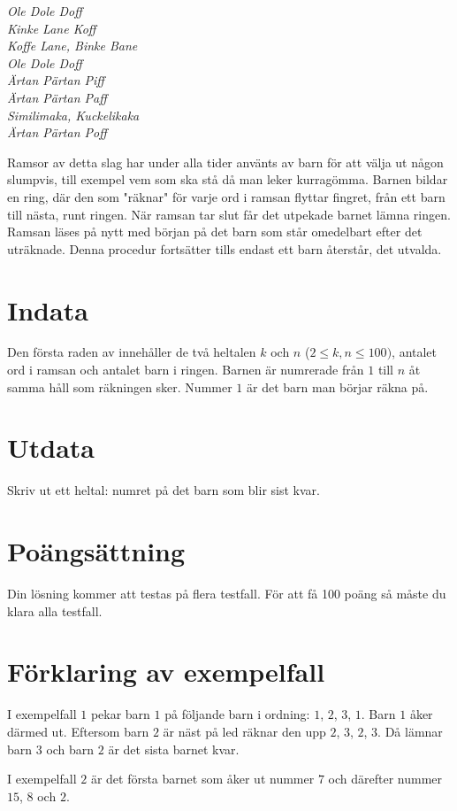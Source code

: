 

{\em
Ole Dole Doff\\ 
Kinke Lane Koff\\ 
Koffe Lane, Binke Bane\\ 
Ole Dole Doff \\
Ärtan Pärtan Piff\\
Ärtan Pärtan Paff \\
Similimaka, Kuckelikaka\\ 
Ärtan Pärtan Poff
}

Ramsor av detta slag har under alla tider använts av barn för att välja ut någon slumpvis, till
exempel vem som ska stå då man leker kurragömma. Barnen bildar en ring, där den som "räknar"
för varje ord i ramsan flyttar fingret, från ett barn till nästa, runt ringen. När ramsan
tar slut får det utpekade barnet lämna ringen. Ramsan läses på nytt med början på det barn som
står omedelbart efter det uträknade. Denna procedur fortsätter tills endast ett barn återstår, det utvalda.

\section*{Indata}
Den första raden av innehåller de två heltalen $k$ och $n$ ($2 \leq k,n \leq 100)$, antalet ord
i ramsan och antalet barn i ringen. Barnen är numrerade från $1$ till $n$ åt samma håll som räkningen
sker. Nummer $1$ är det barn man börjar räkna på.

\section*{Utdata}
Skriv ut ett heltal: numret på det barn som blir sist kvar.

\section*{Poängsättning}
Din lösning kommer att testas på flera testfall. För att få 100 poäng så måste du klara
alla testfall.

\section*{Förklaring av exempelfall}
I exempelfall $1$ pekar barn $1$ på följande barn i ordning: $1$, $2$, $3$, $1$. Barn $1$ åker därmed ut.
Eftersom barn $2$ är näst på led räknar den upp $2$, $3$, $2$, $3$. Då lämnar barn $3$ och barn $2$ är
det sista barnet kvar.

I exempelfall $2$ är det första barnet som åker ut nummer $7$ och därefter nummer $15$, $8$ och $2$.
